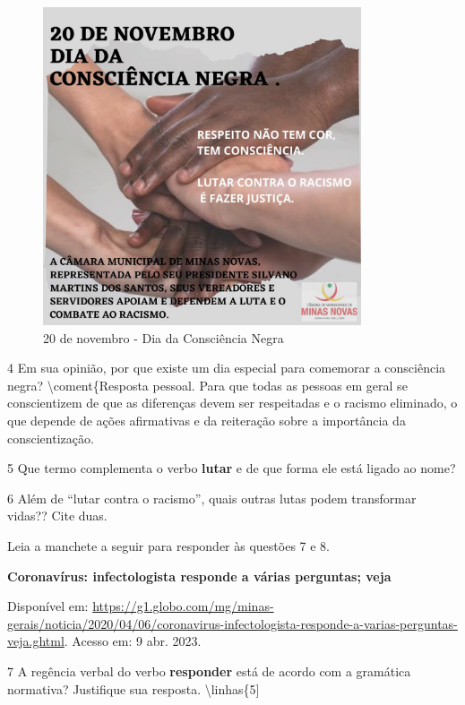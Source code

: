 \begin{itemize}
\begin{itemize}
{\begin{itemize}
\begin{itemize}
\begin{figure}
\centering
\includegraphics[width=3.69792in,height=3.69792in]{./_SAEB_9_POR/media/image32.jpeg}
\caption{20 de novembro - Dia da Consciência Negra}
\end{figure}

\num{4} Em sua opinião, por que existe um dia especial para comemorar a
consciência negra?  \textbackslash{}coment\{Resposta pessoal.
Para que todas as pessoas em geral se conscientizem de que as diferenças
devem ser respeitadas e o racismo eliminado, o que depende de ações
afirmativas e da reiteração sobre a importância da conscientização.

\num{5} Que termo complementa o verbo \textbf{lutar} e de que forma ele
está ligado ao nome? 

\num{6} Além de ``lutar contra o racismo'', quais outras lutas podem
transformar vidas?? Cite duas. 

Leia a manchete a seguir para responder às questões 7 e 8.

\textbf{Coronavírus: infectologista responde a várias perguntas; veja}

Disponível em:
\url{https://g1.globo.com/mg/minas-gerais/noticia/2020/04/06/coronavirus-infectologista-responde-a-varias-perguntas-veja.ghtml}.
Acesso em: 9 abr. 2023.

\num{7} A regência verbal do verbo \textbf{responder} está de acordo com
a gramática normativa? Justifique sua resposta.
\textbackslash{}linhas\{5{]} 


\end{itemize}
\end{itemize}}
\end{itemize}
\end{itemize}
